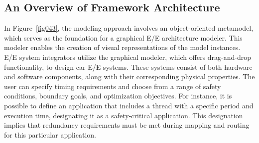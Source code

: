     \subsection{An Overview of Framework Architecture}
    In Figure~\ref{fig043}, the modeling approach involves an object-oriented metamodel, which serves as the foundation for a graphical E/E architecture modeler. This modeler enables the creation of visual representations of the model instances. E/E system integrators utilize the graphical modeler, which offers drag-and-drop functionality, to design car E/E systems. These systems consist of both hardware and software components, along with their corresponding physical properties.
    The user can specify timing requirements and choose from a range of safety conditions, boundary goals, and optimization objectives. For instance, it is possible to define an application that includes a thread with a specific period and execution time, designating it as a safety-critical application. This designation implies that redundancy requirements must be met during mapping and routing for this particular application.




